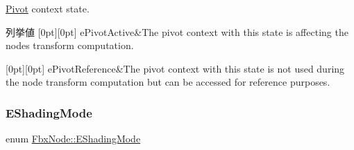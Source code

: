 \hyperlink{class_fbx_node_1_1_pivot}{Pivot} context state. \begin{DoxyEnumFields}{列挙値}
[0pt][0pt]{}\mbox{\label{class_fbx_node_a153fc75958227fc6728a2233b630b58aa3e58a6a13e3ace7a8df4e10d38e830ad}} 
e\+Pivot\+Active&The pivot context with this state is affecting the node\textquotesingle{}s transform computation. \\
\hline

[0pt][0pt]{}\mbox{\label{class_fbx_node_a153fc75958227fc6728a2233b630b58aa461fb50a03f81968c296135f74523bdd}} 
e\+Pivot\+Reference&The pivot context with this state is not used during the node transform computation but can be accessed for reference purposes. \\
\hline

\end{DoxyEnumFields}
\mbox{\label{class_fbx_node_ab65aa5e41d10dfb4c887667c9a56019d}} 
\subsubsection{\texorpdfstring{E\+Shading\+Mode}{EShadingMode}}
{\footnotesize\ttfamily enum \hyperlink{class_fbx_node_ab65aa5e41d10dfb4c887667c9a56019d}{Fbx\+Node\+::\+E\+Shading\+Mode}}

